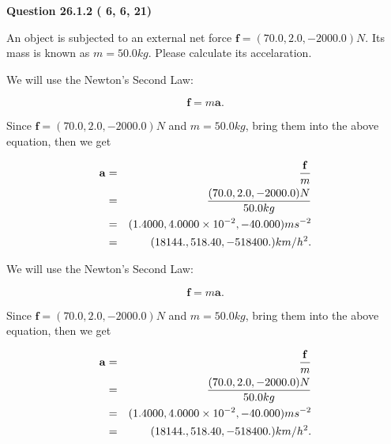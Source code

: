 \documentclass[12pt]{article}
\begin{document}
   
  
\vspace{0.2in}
  
{\textbf{\Large{Question
26.1.2 
 (          6,          6,         21)
}}}
  
  
 
An object is subjected to an external net force $\mathbf{f}=(
70.0,  %
2.0,
-2000.0  )N$. Its mass is known as
$m= %
50.0 kg$. Please calculate its accelaration.
 
 
 
 
\noindent{}
 
 

We will use the Newton's Second Law:
 
\[
\mathbf{f}=m\mathbf{a}.
\]
 
Since $\mathbf{f}=( %
70.0,  %
2.0,  %
-2000.0 )N$
and $m= %
50.0 kg$, bring them into the above equation, then we get
 
\begin{eqnarray*}
\mathbf{a}&=&\frac{\mathbf{f}}m  \\
&=&\frac{(
70.0 ,
2.0 ,
-2000.0 )N
}{ %
50.0 kg}  \\
&=&(
1.4000 ,
4.0000 \times 10^{-2},
-40.000
)ms^{-2} \\
&=&(
18144. ,
518.40 ,
-518400.
)km/h^2.
\end{eqnarray*}
 
 
 
\noindent{}
 
 

 
 
 
\noindent{}
 
 

We will use the Newton's Second Law:
 
\[
\mathbf{f}=m\mathbf{a}.
\]
 
Since $\mathbf{f}=( %
70.0,  %
2.0,  %
-2000.0 )N$
and $m= %
50.0 kg$, bring them into the above equation, then we get
 
\begin{eqnarray*}
\mathbf{a}&=&\frac{\mathbf{f}}m  \\
&=&\frac{(
70.0 ,
2.0 ,
-2000.0 )N
}{ %
50.0 kg}  \\
&=&(
1.4000 ,
4.0000 \times 10^{-2},
-40.000
)ms^{-2} \\
&=&(
18144. ,
518.40 ,
-518400.
)km/h^2.
\end{eqnarray*}
 
\end{document}
